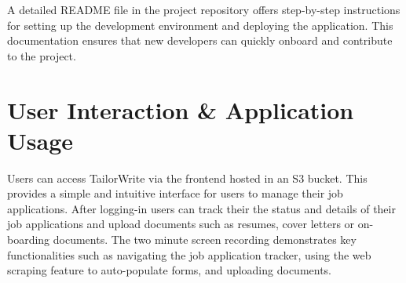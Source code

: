 \documentclass[a4paper, 11pt]{article}
\begin{document}
A detailed README file in the project repository offers step-by-step instructions for setting up the development environment and deploying the application. This documentation ensures that new developers can quickly onboard and contribute to the project.








\section{User Interaction \& Application Usage}

Users can access TailorWrite via the frontend hosted in an S3 bucket. This provides a simple and intuitive interface for users to manage their job applications. After logging-in users can track their the status and details of their job applications and upload documents such as resumes, cover letters or on-boarding documents. The two minute screen recording demonstrates key functionalities such as navigating the job application tracker, using the web scraping feature to auto-populate forms, and uploading documents. 
\end{document}
